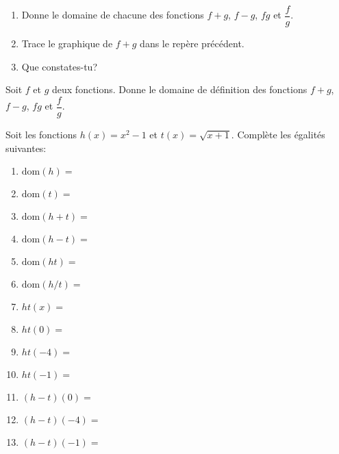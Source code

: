 \documentclass[a4paper,12pt]{report}
\newcommand{\dom}{\mathrm{dom}}
\begin{document}
\begin{exemple}
\begin{enumerate}
\item Donne le domaine de chacune des fonctions \(f+g\), \(f-g\), \(fg\) et
\(\dfrac{f}{g}\).
\vspace{2cm}

\item Trace le graphique de \(f+g\) dans le repère précédent.

\item Que constates-tu?
\vspace{2cm}
\end{enumerate}
\end{exemple}

\begin{exercice}
Soit \(f\) et \(g\) deux fonctions. Donne le domaine de définition des fonctions \(f+g\), \(f-g\), \(fg\) et
   \(\dfrac{f}{g}\).
\end{exercice}
\newpage
\begin{exercice}
Soit les fonctions \(h(x)=x^2-1\) et \(t(x)=\sqrt{x+1}\). Complète les égalités
suivantes:
\par \setlength{\columnseprule}{0 pt}
          \begin{minipage}[t]{\linewidth}
          \begin{multicols}{2}



\begin{enumerate}
\item \(\dom(h)=\) \dotfill
\item \(\dom(t)=\) \dotfill
\item \(\dom(h+t)=\) \dotfill
\item \(\dom(h-t)=\) \dotfill
\item \(\dom(ht)=\) \dotfill
\item \(\dom(h/t)=\) \dotfill
\item \(ht(x)=\) \dotfill
\item \(ht(0)=\) \dotfill
\item \(ht(-4)=\) \dotfill
\item \(ht(-1)=\) \dotfill
\item \((h-t)(0)=\) \dotfill
\item \((h-t)(-4)=\) \dotfill
\item \((h-t)(-1)=\) \dotfill
\end{enumerate}


\end{multicols}\end{minipage}
\end{exercice}
\end{document}
